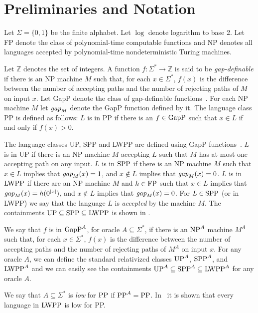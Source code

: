 \documentclass{article}
\newcommand{\UP}{\mbox{\rm UP}}
\newcommand{\PP}{\mbox{\rm PP}}
\newcommand{\GapP}{\mbox{\rm GapP}}
\newcommand{\NP}{\mbox{\rm NP}}
\newcommand{\FP}{\mbox{\rm FP}}
\newcommand{\LWPP}{\mbox{\rm LWPP}}
\newcommand{\SPP}{\mbox{\rm SPP}}
\newcommand{\gap}{\mbox{\it gap}}
\newcommand{\Ints}{{\mathbb{Z}}}
\begin{document}
\section{Preliminaries and Notation}\label{defs}

Let $\Sigma=\{0,1\}$ be the finite alphabet. Let $\log$ denote
logarithm to base 2.  Let FP denote the class of polynomial-time
computable functions and NP denotes all languages accepted by
polynomial-time nondeterministic Turing machines.

Let $\Ints$ denotes the set of integers. A function
$f:\Sigma^*\rightarrow\Ints$ is said to be {\em gap-definable} if
there is an NP machine $M$ such that, for each $x\in\Sigma^*$, $f(x)$
is the difference between the number of accepting paths and the number
of rejecting paths of $M$ on input $x$. Let GapP denote the class of
gap-definable functions~\cite{fenner91gapdefinable}. For each NP
machine $M$ let $\gap_M$ denote the GapP function defined by it. The
language class PP is defined as follows: $L$ is in PP if there is an
$f\in\GapP$ such that $x\in L$ if and only if $f(x)>0$.

The language classes UP, SPP and LWPP are defined using GapP
functions~\cite{fenner91gapdefinable}. $L$ is in UP if there is an NP machine 
$M$ accepting $L$ such that $M$ has at most one accepting path on any
input. $L$ is in $\SPP$ if there is an NP machine $M$ such that $x\in
L$ implies that $\gap_M(x)=1$, and $x\not\in L$ implies that
$\gap_M(x)=0$. $L$ is in $\LWPP$ if there are an NP machine $M$ and
$h\in\FP$ such that $x\in L$ implies that $\gap_M(x)=h(0^{|x|})$, and
$x\not\in L$ implies that $\gap_M(x)=0$. For $L\in\SPP$ (or in LWPP)
we say that the language $L$ is {\em accepted} by the machine $M$. The
containments $\UP\subseteq\SPP\subseteq\LWPP$ is shown in 
\cite{fenner91gapdefinable}.

We say that $f$ is in $\GapP^A$, for oracle $A \subseteq \Sigma^*$, if
there is an $\NP^A$ machine $M^A$ such that, for each $x\in\Sigma^*$,
$f(x)$ is the difference between the number of accepting paths and the
number of rejecting paths of $M^A$ on input $x$. For any oracle $A$,
we can define the standard relativized classes $\UP^A$, $\SPP^A$, and
$\LWPP^A$ and we can easily see the containments
$\UP^A\subseteq\SPP^A\subseteq\LWPP^A$ for any oracle $A$.

We say that $A \subseteq \Sigma^*$ is {\em low} for $\PP$ if
$\PP^A=\PP$.  In~\cite{fenner91gapdefinable} it is shown that every
language in $\LWPP$ is low for PP.
\end{document}
